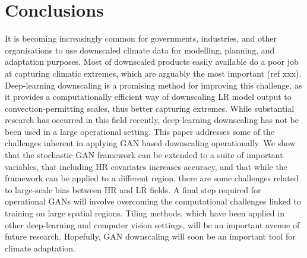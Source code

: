\documentclass{ametsocV6.1}
\begin{document}
\section{Conclusions}
It is becoming increasingly common for governments, industries, and other organisations to use downscaled climate data for modelling, planning, and adaptation purposes. Most of downscaled products easily available do a poor job at capturing climatic extremes, which are arguably the most important (ref xxx). Deep-learning downscaling is a promising method for improving this challenge, as it provides a computationally efficient way of downscaling LR model output to convection-permitting scales, thus better capturing extremes. While substantial research has occurred in this field recently, deep-learning downscaling has not be been used in a large operational setting. This paper addresses some of the challenges inherent in applying GAN based downscaling operationally. We show that the stochastic GAN framework can be extended to a suite of important variables, that including HR covariates increases accuracy, and that while the framework can be applied to a different region, there are some challenges related to large-scale bias between HR and LR fields. A final step required for operational GANs will involve overcoming the computational challenges linked to training on large spatial regions. Tiling methods, which have been applied in other deep-learning and computer vision settings, will be an important avenue of future research. Hopefully, GAN downscaling will soon be an important tool for climate adaptation.
%
\end{document}
